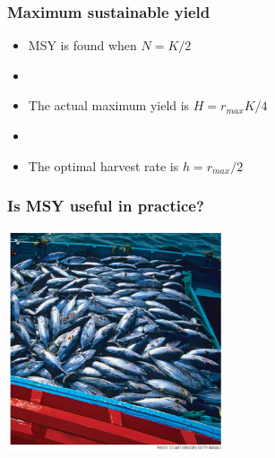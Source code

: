 \documentclass[color=usenames,dvipsnames]{beamer}\usepackage[]{graphicx}\usepackage[]{color}
\begin{document}
\begin{frame}
  \frametitle{Maximum sustainable yield}
  \Large
  \begin{itemize}
    \item MSY is found when $N=K/2$
    \item[]
    \item The actual maximum yield is $H = r_{max}K/4$
    \item[]
    \item The optimal harvest rate is $h = r_{max}/2$
  \end{itemize}
\end{frame}








\begin{frame}
  \frametitle{Is MSY useful in practice?}
  \begin{center}
 \includegraphics[height=6.5cm,keepaspectratio]{figs/tuna}
  \end{center}
\end{frame}
\end{document}
